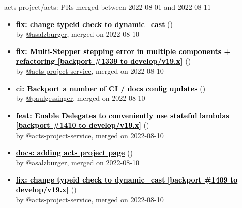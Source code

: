 \begin{frame}[allowframebreaks]{ acts-project/acts: PRs merged 
between 2022-08-01 and 2022-08-11
}
\begin{itemize}
    \item\prmerged\textbf{\href{https://github.com/acts-project/acts/pull/1409}{\textcolor{black}{fix: change typeid check to dynamic\_cast}}}
    (\href{https://github.com/acts-project/acts/pull/1409}{}) \\
    by \href{https://github.com/asalzburger}{@asalzburger}, merged on 2022-08-10

    \item\prmerged\textbf{\href{https://github.com/acts-project/acts/pull/1382}{\textcolor{black}{fix: Multi-Stepper stepping error in multiple components + refactoring [backport \#1339 to develop/v19.x]}}}
    (\href{https://github.com/acts-project/acts/pull/1382}{}) \\
    by \href{https://github.com/acts-project-service}{@acts-project-service}, merged on 2022-08-10

    \item\prmerged\textbf{\href{https://github.com/acts-project/acts/pull/1415}{\textcolor{black}{ci: Backport a number of CI / docs config updates}}}
    (\href{https://github.com/acts-project/acts/pull/1415}{}) \\
    by \href{https://github.com/paulgessinger}{@paulgessinger}, merged on 2022-08-10

    \item\prmerged\textbf{\href{https://github.com/acts-project/acts/pull/1414}{\textcolor{black}{feat: Enable Delegates to conveniently use stateful lambdas [backport \#1410 to develop/v19.x]}}}
    (\href{https://github.com/acts-project/acts/pull/1414}{}) \\
    by \href{https://github.com/acts-project-service}{@acts-project-service}, merged on 2022-08-10

    \item\prmerged\textbf{\href{https://github.com/acts-project/acts/pull/1392}{\textcolor{black}{docs: adding acts project page}}}
    (\href{https://github.com/acts-project/acts/pull/1392}{}) \\
    by \href{https://github.com/asalzburger}{@asalzburger}, merged on 2022-08-10

    \item\prmerged\textbf{\href{https://github.com/acts-project/acts/pull/1413}{\textcolor{black}{fix: change typeid check to dynamic\_cast [backport \#1409 to develop/v19.x]}}}
    (\href{https://github.com/acts-project/acts/pull/1413}{}) \\
    by \href{https://github.com/acts-project-service}{@acts-project-service}, merged on 2022-08-10


\end{itemize}
\end{frame}
